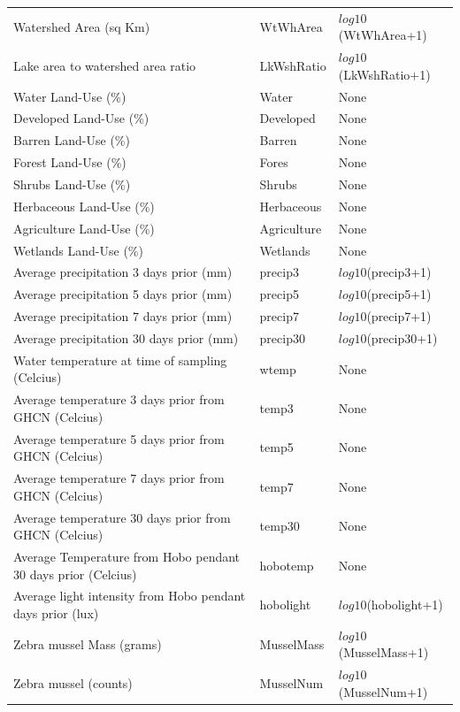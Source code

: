 \begin{center}
\begin{longtable}{p{3.5cm}p{1cm}p{3.3cm}}
Watershed Area (sq Km) &  WtWhArea & $log10$(WtWhArea+1) \\
Lake area to watershed area ratio & LkWshRatio &  $log10$(LkWshRatio+1) \\
Water Land-Use (\%) & Water &  None \\
Developed Land-Use  (\%) & Developed & None \\
Barren Land-Use (\%) & Barren & None \\
Forest Land-Use (\%) & Fores & None \\
Shrubs Land-Use (\%) & Shrubs & None \\
Herbaceous Land-Use (\%) & Herbaceous  & None \\
Agriculture Land-Use (\%) & Agriculture & None \\
Wetlands Land-Use (\%) & Wetlands & None \\
Average precipitation 3 days prior (mm) & precip3 &  $log10$(precip3+1) \\
Average precipitation 5 days prior (mm)  & precip5 & $log10$(precip5+1) \\
Average precipitation 7 days prior (mm) & precip7 &  $log10$(precip7+1) \\
Average precipitation 30 days prior (mm) & precip30 &  $log10$(precip30+1) \\
Water temperature at time of sampling (Celcius) & wtemp & None \\
Average temperature 3 days prior from GHCN (Celcius) & temp3&  None \\
Average temperature 5 days prior from GHCN (Celcius) & temp5 & None \\
Average temperature 7 days prior  from GHCN (Celcius) &  temp7 & None \\
Average temperature 30 days prior from GHCN (Celcius) & temp30 &  None \\
Average Temperature from Hobo pendant 30 days prior (Celcius) & hobotemp & None \\
Average light intensity from Hobo pendant days prior (lux) & hobolight & $log10$(hobolight+1) \\
Zebra mussel Mass (grams) & MusselMass &  $log10$(MusselMass+1) \\
Zebra mussel (counts) &  MusselNum & $log10$(MusselNum+1) \\
\hline
\end{longtable}
\end{center}

